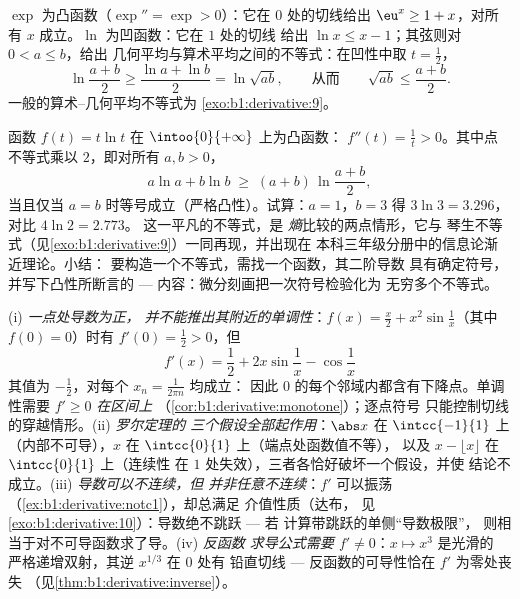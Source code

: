 \begin{example}[经典的凸性不等式]\label{ex:b1:derivative:convexineq}
$\exp$ 为凸函数（$\exp'' = \exp > 0$）：它在 $0$ 处的切线给出
$\eu^x \geq 1 + x$，对所有 $x$ 成立。$\ln$ 为凹函数：它在 $1$ 处的切线
给出 $\ln x \leq x - 1$；其弦则对 $0 < a \leq b$，给出
几何平均与算术平均之间的不等式：在凹性中取 $t =
\frac12$，
\[
\ln\frac{a + b}{2} \geq \frac{\ln a + \ln b}{2} = \ln\sqrt{ab},
\qquad\text{从而}\qquad
\sqrt{ab} \leq \frac{a+b}{2} .
\]
一般的算术--几何平均不等式为
\cref{exo:b1:derivative:9}。
\end{example}

\begin{example}[从零开始的凸性不等式]\label{ex:b1:derivative:xlnx}
函数 $f(t) = t\ln t$ 在 $\intoo{0}{+\infty}$ 上为凸函数：
$f''(t) = \frac1t > 0$。其中点不等式乘以
$2$，即对所有 $a, b > 0$，
\[
a\ln a + b\ln b \;\geq\; (a + b)\,\ln\frac{a + b}{2} ,
\]
当且仅当 $a = b$ 时等号成立（严格凸性）。试算：$a =
1$，$b = 3$ 得 $3\ln 3 = 3.296$，对比 $4\ln 2 = 2.773$。
这一平凡的不等式，是
\emph{熵}比较的两点情形，它与
琴生不等式（见\cref{exo:b1:derivative:9}）一同再现，并出现在
本科三年级分册中的信息论渐近理论。小结：
要构造一个不等式，需找一个函数，其二阶导数
具有确定符号，并写下凸性所断言的 ---
内容：微分刻画把一次符号检验化为
无穷多个不等式。
\end{example}

\begin{remark}[导数的常见误区]
(i) \emph{一点处导数为正，
并不能推出其附近的单调性}：$f(x) = \frac x2 + x^2\sin\frac1x$（其中
$f(0) = 0$）时有 $f'(0) = \frac12 > 0$，但
\[
f'(x) = \frac12 + 2x\sin\frac1x - \cos\frac1x
\]
其值为 $-\frac12$，对每个 $x_n = \frac{1}{2\pi n}$ 均成立：
因此 $0$ 的每个邻域内都含有下降点。单调性需要 $f'
\geq 0$ \emph{在区间上}
（\cref{cor:b1:derivative:monotone}）；逐点符号
只能控制切线的穿越情形。(ii) \emph{罗尔定理的
三个假设全部起作用}：$\abs x$ 在 $\intcc{-1}{1}$ 上
（内部不可导），$x$ 在 $\intcc{0}{1}$ 上（端点处函数值不等），
以及 $x - \lfloor x\rfloor$ 在 $\intcc{0}{1}$ 上（连续性
在 $1$ 处失效），三者各恰好破坏一个假设，并使
结论不成立。(iii) \emph{导数可以不连续，但
并非任意不连续}：$f'$ 可以振荡
（\cref{ex:b1:derivative:notc1}），却总满足
介值性质（达布，
见\cref{exo:b1:derivative:10}）：导数绝不跳跃 --- 若
计算带跳跃的单侧“导数极限”，
则相当于对不可导函数求了导。(iv) \emph{反函数
求导公式需要 $f' \neq 0$}：$x \mapsto x^3$ 是光滑的
严格递增双射，其逆 $x^{1/3}$ 在 $0$ 处有
铅直切线 --- 反函数的可导性恰在
$f'$ 为零处丧失
（见\cref{thm:b1:derivative:inverse}）。
\end{remark}

